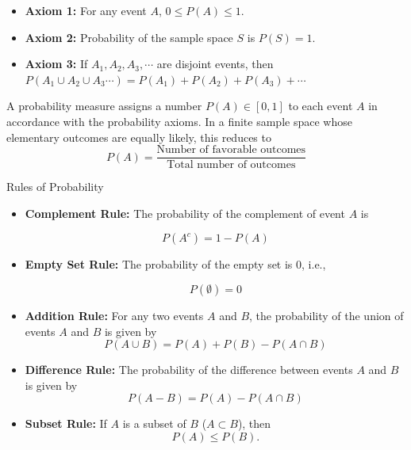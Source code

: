 \begin{axiom}
    \begin{itemize}
        \item \textbf{Axiom 1:} For any event \(A\), \( 0 \leq P(A) \leq 1 \).
        \item \textbf{Axiom 2:} Probability of the sample space \(S\) is \(P(S) = 1\).
        \item \textbf{Axiom 3:} If \(A_1, A_2, A_3, \cdots\) are disjoint events, then \(P\left(A_1 \cup A_2 \cup A_3 \cdots\right) = P\left(A_1\right) + P\left(A_2\right) + P\left(A_3\right) + \cdots\)
    \end{itemize}
\end{axiom}

\begin{definition}
    A probability measure assigns a number \(P(A)\in[0,1]\) to each event \(A\) in accordance with the probability axioms. In a finite sample space whose elementary outcomes are equally likely, this reduces to
    \[
    P(A) = \frac{\text{Number of favorable outcomes}}{\text{Total number of outcomes}}
    \]
\end{definition}

\begin{theorem}{Rules of Probability}
    \begin{itemize}
        \item \textbf{Complement Rule:} The probability of the complement of event $A$ is
    
        \[
        P(A^c) = 1 - P(A)
        \]

        \item \textbf{Empty Set Rule:} The probability of the empty set is 0, i.e.,
        
        \[P(\emptyset) = 0\]
        
        \item \textbf{Addition Rule:} For any two events $A$ and $B$, the probability of the union of events $A$ and $B$ is given by
        \[
        P(A \cup B) = P(A) + P(B) - P(A \cap B)
        \]

        \item \textbf{Difference Rule:} The probability of the difference between events $A$ and $B$ is given by
        \[
        P(A-B)=P(A)-P(A \cap B)
        \]
        \item \textbf{Subset Rule:} If $A$ is a subset of $B$ ($A \subset B$), then
        \[P(A) \leq P(B).\]
    \end{itemize}
\end{theorem}

